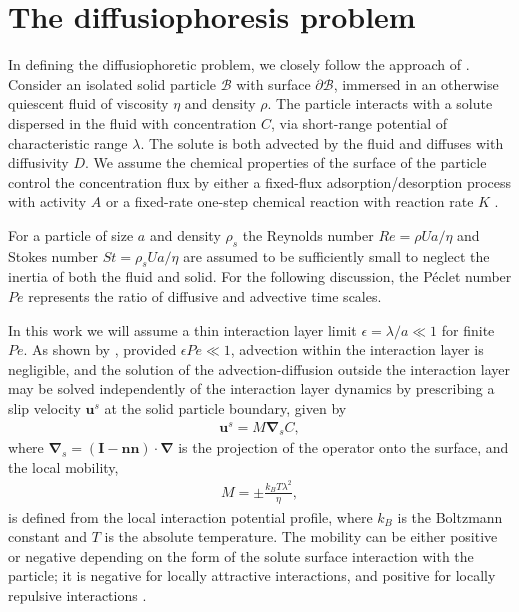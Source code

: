 \documentclass[aps,pre,reprint,twocolumn,notitlepage,superscriptaddress]{revtex4-1}
\begin{document}
\section{The diffusiophoresis problem}
In defining the diffusiophoretic problem, we closely follow the approach of \citet{michelin14}. Consider an isolated solid particle $\mathcal{B}$ with surface $\mathcal{\partial B}$, immersed in an otherwise quiescent fluid of viscosity $\eta$ and density $\rho$. The particle interacts with a solute dispersed in the fluid with concentration $C$, via short-range potential of characteristic range $\lambda$.  The solute is both advected by the fluid and diffuses with diffusivity $D$. We assume the chemical properties of the surface of the particle control the concentration flux by either a fixed-flux adsorption/desorption process with activity $A$ or a fixed-rate one-step chemical reaction with reaction rate $K$ \citep{michelin14}.


For a particle of size $a$ and density $\rho_s$ the Reynolds number $Re=\rho Ua/\eta$ and Stokes number $St=\rho_{s}Ua/\eta$ are assumed to be sufficiently small to neglect the inertia of both the fluid and solid. For the following discussion, the P\'eclet number $Pe$ represents the ratio of diffusive and advective time scales.

In this work we will assume a thin interaction layer limit $\epsilon = \lambda/a\ll 1$ for finite $Pe$. As shown by \citet{michelin14}, provided $\epsilon Pe\ll1$, advection within the interaction layer is negligible, and the solution of the advection-diffusion outside the interaction layer may be solved independently of the interaction layer dynamics by prescribing a slip velocity $\boldsymbol{u}^{s}$ at the solid particle boundary, given by
\begin{align}\label{Slipvelo}
\boldsymbol{u}^{s}=M \boldsymbol{\nabla}_s C,
\end{align}
where $\boldsymbol{\nabla}_s = (\boldsymbol{I}-\boldsymbol{nn})\cdot\boldsymbol{\nabla}$ is the projection of the operator onto the surface, and the local mobility,
\begin{align}
M=\pm\frac{k_{B}T\lambda^{2}}{\eta},
\end{align}
is defined from the local interaction potential profile, where $k_{B}$ is the Boltzmann constant and $T$ is the absolute temperature. The mobility can be either positive or negative depending on the form of the solute surface interaction with the particle; it is negative for locally attractive interactions, and positive for locally repulsive interactions \citep{michelin14}.
\end{document}
